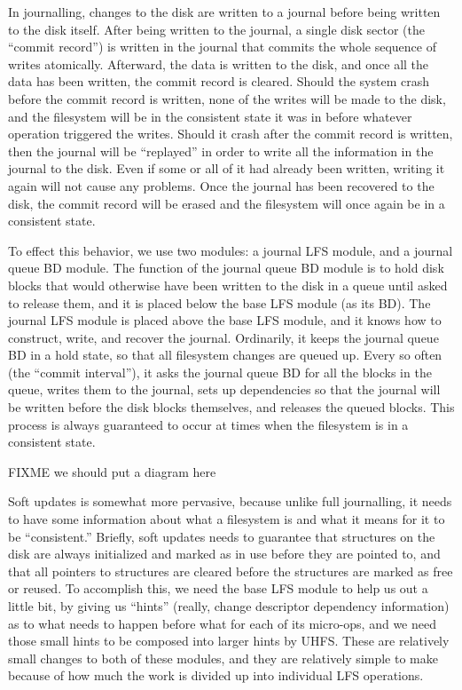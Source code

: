 In journalling, changes to the disk are written to a journal before being
written to the disk itself. After being written to the journal, a single disk
sector (the ``commit record'') is written in the journal that commits the whole
sequence of writes atomically. Afterward, the data is written to the disk, and
once all the data has been written, the commit record is cleared. Should the
system crash before the commit record is written, none of the writes will be
made to the disk, and the filesystem will be in the consistent state it was in
before whatever operation triggered the writes. Should it crash after the commit
record is written, then the journal will be ``replayed'' in order to write all
the information in the journal to the disk. Even if some or all of it had
already been written, writing it again will not cause any problems. Once the
journal has been recovered to the disk, the commit record will be erased and the
filesystem will once again be in a consistent state.

To effect this behavior, we use two modules: a journal LFS module, and a journal
queue BD module. The function of the journal queue BD module is to hold disk
blocks that would otherwise have been written to the disk in a queue until asked
to release them, and it is placed below the base LFS module (as its BD). The
journal LFS module is placed above the base LFS module, and it knows how to
construct, write, and recover the journal. Ordinarily, it keeps the journal
queue BD in a hold state, so that all filesystem changes are queued up. Every so
often (the ``commit interval''), it asks the journal queue BD for all the blocks
in the queue, writes them to the journal, sets up dependencies so that the
journal will be written before the disk blocks themselves, and releases the
queued blocks. This process is always guaranteed to occur at times when the
filesystem is in a consistent state.

FIXME we should put a diagram here

Soft updates is somewhat more pervasive, because unlike full journalling, it
needs to have some information about what a filesystem is and what it means for
it to be ``consistent.'' Briefly, soft updates needs to guarantee that
structures on the disk are always initialized and marked as in use before they
are pointed to, and that all pointers to structures are cleared before the
structures are marked as free or reused. To accomplish this, we need the base
LFS module to help us out a little bit, by giving us ``hints'' (really, change
descriptor dependency information) as to what needs to happen before what for
each of its micro-ops, and we need those small hints to be composed into larger
hints by UHFS. These are relatively small changes to both of these modules, and
they are relatively simple to make because of how much the work is divided up
into individual LFS operations.

